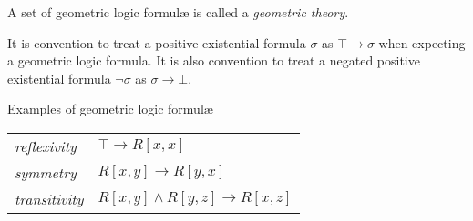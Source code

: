 		A set of geometric logic formul{\ae} is called a \emph{geometric
		theory}.

		It is convention to treat a positive existential formula $\sigma$ as
		$\top \to \sigma$ when expecting a geometric logic formula. It is also
		convention to treat a negated positive existential formula $\neg\sigma$
		as $\sigma \to \bot$.

		Examples of geometric logic formul{\ae}

		\begin{tabular}{ll}
		\emph{reflexivity}  \quad  &  $\top \to R[x,x]$                  \\
		\emph{symmetry}     \quad  &  $R[x,y] \to R[y,x]$                \\
		\emph{transitivity} \quad  &  $R[x,y] \wedge R[y,z] \to R[x,z]$  \\
		\end{tabular}

